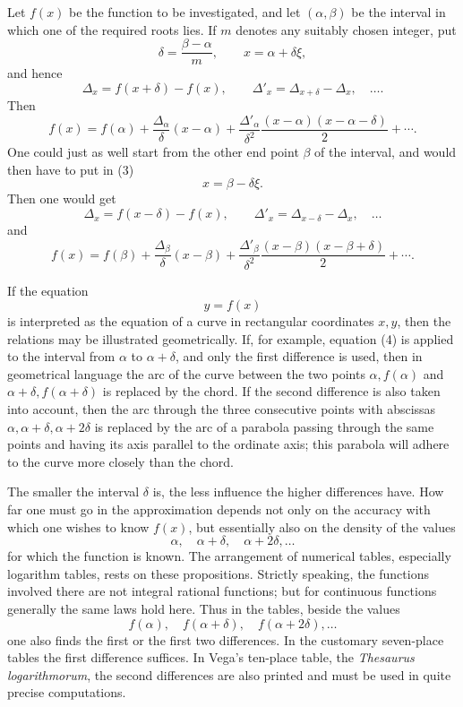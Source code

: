 \documentclass[11pt]{article}
\begin{document}
Let $f(x)$ be the function to be investigated, and let $(\alpha,\beta)$ be the interval in which one of the required roots lies. If $m$ denotes any suitably chosen integer, put
\[
        \delta=\frac{\beta-\alpha}{m},\qquad x=\alpha+\delta\xi,
\]
and hence
\[
        \Delta_x=f(x+\delta)-f(x),\qquad
        \Delta'_x=\Delta_{x+\delta}-\Delta_x,\quad\ldots .
\]
Then
\begin{equation}
        f(x)=f(\alpha)+\frac{\Delta_\alpha}{\delta}(x-\alpha)
        +\frac{\Delta'_\alpha}{\delta^2}
          \frac{(x-\alpha)(x-\alpha-\delta)}{2}+\cdots .
\tag{4}
\end{equation}
One could just as well start from the other end point $\beta$ of the interval, and would then have to put in (3)
\[
        x=\beta-\delta\xi .
\]
Then one would get
\[
        \Delta_x=f(x-\delta)-f(x),\qquad
        \Delta'_x=\Delta_{x-\delta}-\Delta_x,\quad\ldots
\]
and
\begin{equation}
        f(x)=f(\beta)+\frac{\Delta_\beta}{\delta}(x-\beta)
        +\frac{\Delta'_\beta}{\delta^2}
          \frac{(x-\beta)(x-\beta+\delta)}{2}+\cdots .
\tag{5}
\end{equation}

If the equation
\[
        y=f(x)
\]
is interpreted as the equation of a curve in rectangular coordinates $x,y$, then the relations may be illustrated geometrically. If, for example, equation (4) is applied to the interval from $\alpha$ to $\alpha+\delta$, and only the first difference is used, then in geometrical language the arc of the curve between the two points $\alpha,f(\alpha)$ and $\alpha+\delta,f(\alpha+\delta)$ is replaced by the chord. If the second difference is also taken into account, then the arc through the three consecutive points with abscissas $\alpha,\alpha+\delta,\alpha+2\delta$ is replaced by the arc of a parabola passing through the same points and having its axis parallel to the ordinate axis; this parabola will adhere to the curve more closely than the chord.

The smaller the interval $\delta$ is, the less influence the higher differences have. How far one must go in the approximation depends not only on the accuracy with which one wishes to know $f(x)$, but essentially also on the density of the values
\[
        \alpha,\quad \alpha+\delta,\quad \alpha+2\delta,\ldots
\]
for which the function is known. The arrangement of numerical tables, especially logarithm tables, rests on these propositions. Strictly speaking, the functions involved there are not integral rational functions; but for continuous functions generally the same laws hold here. Thus in the tables, beside the values
\[
        f(\alpha),\quad f(\alpha+\delta),\quad f(\alpha+2\delta),\ldots
\]
one also finds the first or the first two differences. In the customary seven-place tables the first difference suffices. In Vega's ten-place table, the \emph{Thesaurus logarithmorum}, the second differences are also printed and must be used in quite precise computations.
\end{document}
